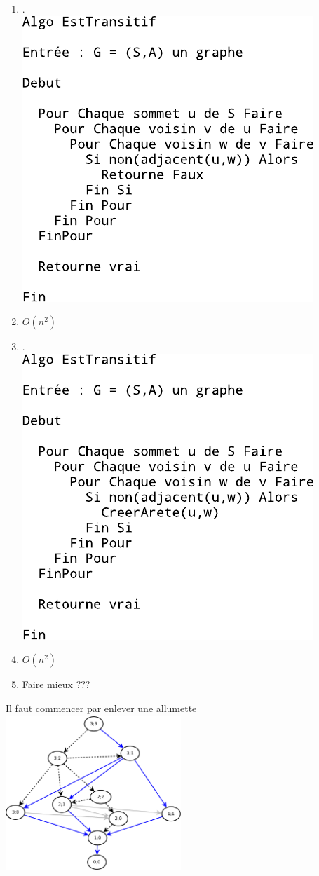 \begin{enumerate}
	\item .\\ 
\includegraphics{Images/fig24.pdf}
	\item $O(n^2)$
	\item .\\
\includegraphics{Images/fig25.pdf}
	\item $O(n^2)$
	\item Faire mieux ???
\end{enumerate}

 Il faut commencer par enlever une allumette \\
\includegraphics[width=250px]{Images/fig26.pdf} \\

